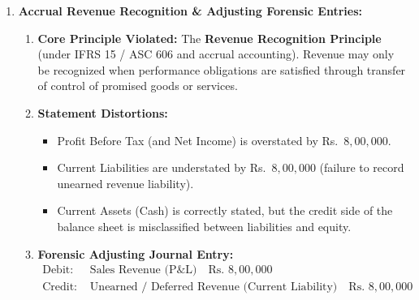 \begin{enumerate}[label=\textbf{P1.\arabic*}]
    \item \textbf{Accrual Revenue Recognition \& Adjusting Forensic Entries:}
    \begin{enumerate}[label=(\alph*)]
        \item \textbf{Core Principle Violated:} The \textbf{Revenue Recognition Principle} (under IFRS 15 / ASC 606 and accrual accounting). Revenue may only be recognized when performance obligations are satisfied through transfer of control of promised goods or services.
        \item \textbf{Statement Distortions:}
        \begin{itemize}
            \item Profit Before Tax (and Net Income) is overstated by Rs.~$8{,}00{,}000$.
            \item Current Liabilities are understated by Rs.~$8{,}00{,}000$ (failure to record unearned revenue liability).
            \item Current Assets (Cash) is correctly stated, but the credit side of the balance sheet is misclassified between liabilities and equity.
        \end{itemize}
        \item \textbf{Forensic Adjusting Journal Entry:}
        \begin{align*}
        \text{Debit: } & \text{Sales Revenue (P\&L)} \quad \text{Rs.~} 8{,}00{,}000 \\
        \text{Credit: } & \text{Unearned / Deferred Revenue (Current Liability)} \quad \text{Rs.~} 8{,}00{,}000
        \end{align*}
    \end{enumerate}


\end{enumerate}
